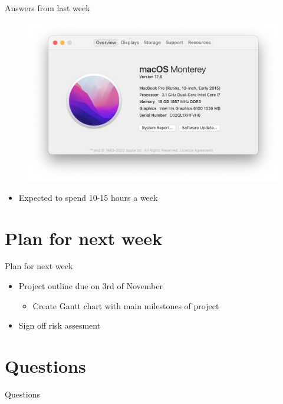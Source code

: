 \documentclass{beamer}
\begin{document}
\begin{frame}{Answers from last week}
\begin{figure}
    \centering
    \includegraphics[scale=0.35]{Weekly meeting slides/meeting 2/Screenshot 2023-10-27 at 10.20.22 am.png}
    \label{fig:enter-label}
\end{figure}
\begin{itemize}
    \item Expected to spend 10-15 hours a week
\end{itemize}

\end{frame}

\section{Plan for next week}
\begin{frame}{Plan for next week}
    \begin{itemize}
    \item Project outline due on 3rd of November
    \begin{itemize}
      \item Create Gantt chart with main milestones of project
    \end{itemize}
    \item Sign off risk assesment
    \end{itemize}
\end{frame}

\section{Questions}

\begin{frame}{Questions}
    
\end{frame}
\end{document}
